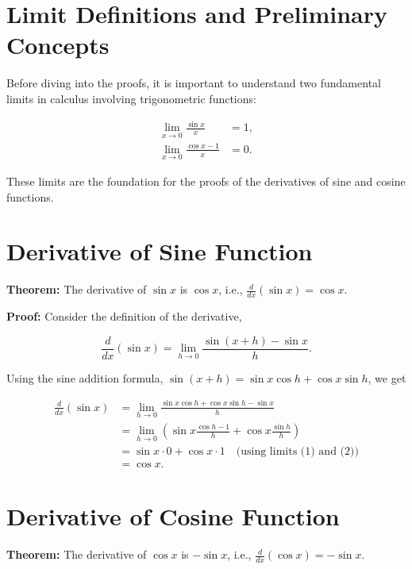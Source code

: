 \documentclass[a4paper,12pt]{book}
\begin{document}
\section*{Limit Definitions and Preliminary Concepts}

Before diving into the proofs, it is important to understand two fundamental limits in calculus involving trigonometric functions:

\begin{align}
    \lim_{x \to 0} \frac{\sin x}{x} &= 1, \\
    \lim_{x \to 0} \frac{\cos x - 1}{x} &= 0.
\end{align}

These limits are the foundation for the proofs of the derivatives of sine and cosine functions.

\section*{Derivative of Sine Function}

\textbf{Theorem:} The derivative of $\sin x$ is $\cos x$, i.e., $\frac{d}{dx}(\sin x) = \cos x$.

\textbf{Proof:} Consider the definition of the derivative,

\begin{equation}
    \frac{d}{dx}(\sin x) = \lim_{h \to 0} \frac{\sin(x+h) - \sin x}{h}.
\end{equation}

Using the sine addition formula, $\sin(x+h) = \sin x \cos h + \cos x \sin h$, we get

\begin{align*}
    \frac{d}{dx}(\sin x) &= \lim_{h \to 0} \frac{\sin x \cos h + \cos x \sin h - \sin x}{h} \\
                         &= \lim_{h \to 0} \left(\sin x \frac{\cos h - 1}{h} + \cos x \frac{\sin h}{h}\right) \\
                         &= \sin x \cdot 0 + \cos x \cdot 1 \quad \text{(using limits (1) and (2))} \\
                         &= \cos x.
\end{align*}

\section*{Derivative of Cosine Function}

\textbf{Theorem:} The derivative of $\cos x$ is $-\sin x$, i.e., $\frac{d}{dx}(\cos x) = -\sin x$.
\end{document}
